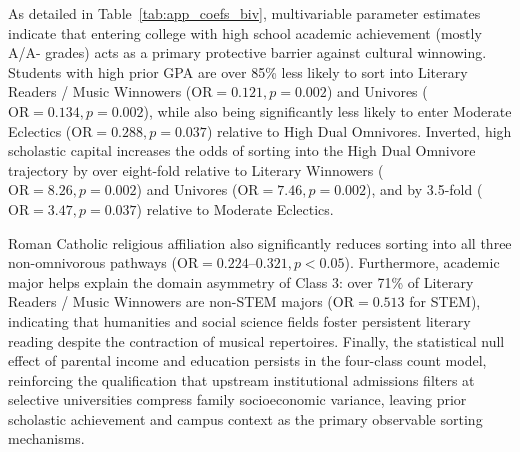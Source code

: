 \documentclass[12pt]{article}
\begin{document}
As detailed in Table~\ref{tab:app_coefs_biv}, multivariable parameter estimates indicate that entering college with high school academic achievement (mostly A/A- grades) acts as a primary protective barrier against cultural winnowing. Students with high prior GPA are over 85\% less likely to sort into Literary Readers / Music Winnowers ($\text{OR} = 0.121, p = 0.002$) and Univores ($\text{OR} = 0.134, p = 0.002$), while also being significantly less likely to enter Moderate Eclectics ($\text{OR} = 0.288, p = 0.037$) relative to High Dual Omnivores. Inverted, high scholastic capital increases the odds of sorting into the High Dual Omnivore trajectory by over eight-fold relative to Literary Winnowers ($\text{OR} = 8.26, p = 0.002$) and Univores ($\text{OR} = 7.46, p = 0.002$), and by 3.5-fold ($\text{OR} = 3.47, p = 0.037$) relative to Moderate Eclectics. 

Roman Catholic religious affiliation also significantly reduces sorting into all three non-omnivorous pathways ($\text{OR} = 0.224\text{--}0.321, p < 0.05$). Furthermore, academic major helps explain the domain asymmetry of Class 3: over 71\% of Literary Readers / Music Winnowers are non-STEM majors ($\text{OR} = 0.513$ for STEM), indicating that humanities and social science fields foster persistent literary reading despite the contraction of musical repertoires. Finally, the statistical null effect of parental income and education persists in the four-class count model, reinforcing the qualification that upstream institutional admissions filters at selective universities compress family socioeconomic variance, leaving prior scholastic achievement and campus context as the primary observable sorting mechanisms.
\end{document}
